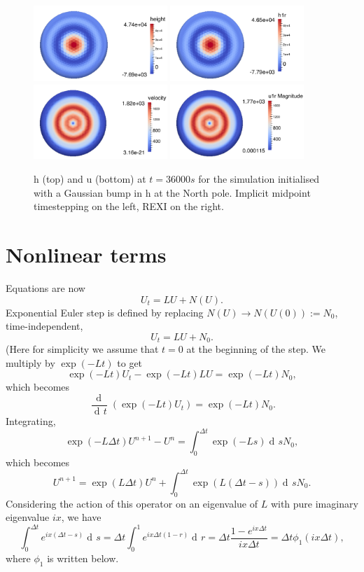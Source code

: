 \documentclass[14pt]{article}
\DeclareMathOperator{\diff}{d\!}
\newcommand{\dd}[1]{\frac{\diff}{\diff #1}}
\begin{document}
\begin{figure}
  \centering
  \includegraphics[width=0.45\textwidth]{results/im_h_polar_t36000}
  \includegraphics[width=0.45\textwidth]{results/rexi_h_polar_t36000}\\
  \includegraphics[width=0.45\textwidth]{results/im_u_polar_t36000}
  \includegraphics[width=0.45\textwidth]{results/rexi_u_polar_t36000}\\
\caption{h (top) and u (bottom) at $t=36000s$ for the simulation initialised with a Gaussian bump in h at the North pole. Implicit midpoint timestepping on the left, REXI on the right.}
\label{polar_bump}
\end{figure}

\section{Nonlinear terms}

Equations are now
\[
U_t = LU + N(U).
\]
Exponential Euler step is defined by replacing $N(U)\to N(U(0)):=N_0$,
time-independent,
\[
U_t = LU + N_0.
\]
(Here for simplicity we assume that $t=0$ at the beginning of the step.
We multiply by $\exp(-Lt)$ to get
\[
\exp(-Lt)U_t - \exp(-Lt)LU = \exp(-Lt)N_0,
\]
which becomes
\[
\dd{t}\left(\exp(-Lt)U_t\right) = \exp(-Lt)N_0.
\]
Integrating,
\[
\exp(-L\Delta t)U^{n+1} - U^n = \int_0^{\Delta t} \exp(-Ls)\diff s N_0,
\]
which becomes
\[
U^{n+1} = \exp(L\Delta t)U^n + \int_0^{\Delta t}\exp(L(\Delta t-s))\diff s N_0.
\]
Considering the action of this operator on an eigenvalue of $L$ with pure
imaginary eigenvalue $ix$, we have
\[
\int_0^{\Delta t}e^{ix(\Delta t-s)}\diff s
= \Delta t \int_0^1 e^{ix\Delta t(1-r)}\diff r
= \Delta t\frac{1-e^{ix\Delta t}}{ix\Delta t}
= \Delta t \phi_1(ix\Delta t),
\]
where $\phi_1$ is written below.
\end{document}

